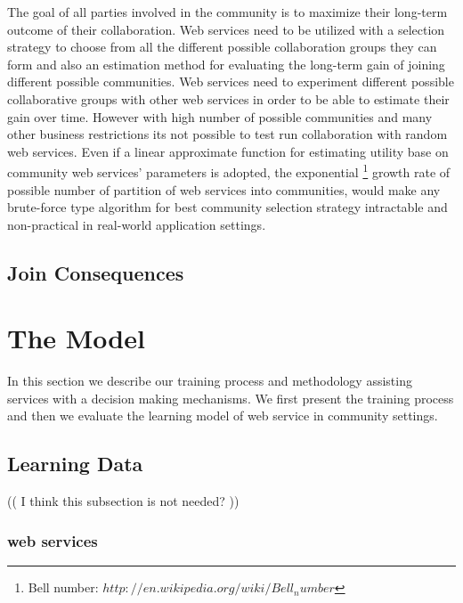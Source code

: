\documentclass[10pt,journal,cspaper,compsoc]{IEEEtran}
\begin{document}
The goal of all parties involved in the community is to maximize their long-term outcome of their collaboration. Web services need to be utilized with a selection strategy to choose from all the different possible collaboration groups they can form and also an estimation method for evaluating the long-term gain of joining different possible communities. Web services need to experiment different possible collaborative groups with other web services in order to be able to estimate their gain over time. However with high number of possible communities and many other business restrictions its not possible to test run collaboration with random web services. Even if a linear approximate function for estimating utility base on community web services' parameters is adopted, the exponential \footnote{Bell number: $http://en.wikipedia.org/wiki/Bell_number$} growth rate of possible number of partition of web services into communities, would make any brute-force type algorithm for best community selection strategy intractable and non-practical in real-world application settings.

\subsection{Join Consequences}\label{s:jc}


\section{The Model}\label{s:model}

In this section we describe our training process and methodology assisting services with a decision making mechanisms. We first present the training process and then we evaluate the learning model of web service in community settings.

\subsection{Learning Data}\label{ss:learningdata}

(( I think this subsection is not needed? ))

\subsubsection{web services}\label{sss:webservices}
\end{document}
